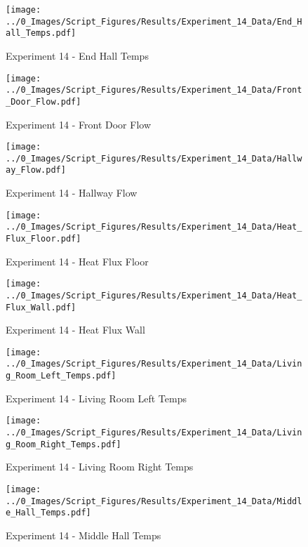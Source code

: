 	\begin{figure}[H]
		\centering
		\texttt{[image: ../0\_Images/Script\_Figures/Results/Experiment\_14\_Data/End\_Hall\_Temps.pdf]}
		\caption[]{Experiment 14 - End Hall Temps}
	\end{figure}
 
	\clearpage

	\begin{figure}[H]
		\centering
		\texttt{[image: ../0\_Images/Script\_Figures/Results/Experiment\_14\_Data/Front\_Door\_Flow.pdf]}
		\caption[]{Experiment 14 - Front Door Flow}
	\end{figure}
 

	\begin{figure}[H]
		\centering
		\texttt{[image: ../0\_Images/Script\_Figures/Results/Experiment\_14\_Data/Hallway\_Flow.pdf]}
		\caption[]{Experiment 14 - Hallway Flow}
	\end{figure}
 
	\clearpage

	\begin{figure}[H]
		\centering
		\texttt{[image: ../0\_Images/Script\_Figures/Results/Experiment\_14\_Data/Heat\_Flux\_Floor.pdf]}
		\caption[]{Experiment 14 - Heat Flux Floor}
	\end{figure}
 

	\begin{figure}[H]
		\centering
		\texttt{[image: ../0\_Images/Script\_Figures/Results/Experiment\_14\_Data/Heat\_Flux\_Wall.pdf]}
		\caption[]{Experiment 14 - Heat Flux Wall}
	\end{figure}
 
	\clearpage

	\begin{figure}[H]
		\centering
		\texttt{[image: ../0\_Images/Script\_Figures/Results/Experiment\_14\_Data/Living\_Room\_Left\_Temps.pdf]}
		\caption[]{Experiment 14 - Living Room Left Temps}
	\end{figure}
 

	\begin{figure}[H]
		\centering
		\texttt{[image: ../0\_Images/Script\_Figures/Results/Experiment\_14\_Data/Living\_Room\_Right\_Temps.pdf]}
		\caption[]{Experiment 14 - Living Room Right Temps}
	\end{figure}
 
	\clearpage

	\begin{figure}[H]
		\centering
		\texttt{[image: ../0\_Images/Script\_Figures/Results/Experiment\_14\_Data/Middle\_Hall\_Temps.pdf]}
		\caption[]{Experiment 14 - Middle Hall Temps}
	\end{figure}
 

